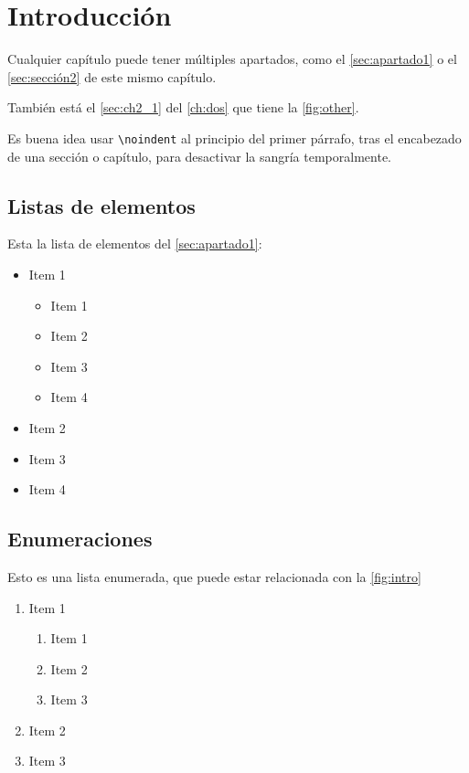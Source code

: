 \chapter{Introducción}
\label{ch:intro}

\noindent Cualquier capítulo puede tener múltiples apartados, como el \autoref{sec:apartado1} o el \autoref{sec:sección2} de este mismo capítulo.

También está el \autoref{sec:ch2_1} del \autoref{ch:dos} que tiene la \autoref{fig:other}.

Es buena idea usar \texttt{\textbackslash{noindent}} al principio del primer párrafo, tras el encabezado de una sección o capítulo, para desactivar la sangría temporalmente.

\section{Listas de elementos}
\label{sec:apartado1}

\noindent Esta la lista de elementos del \autoref{sec:apartado1}:

\begin{itemize}
    \item Item 1
    \begin{itemize}
        \item Item 1
        \item Item 2
        \item Item 3
        \item Item 4
    \end{itemize}
    
    \item Item 2
    \item Item 3
    \item Item 4
\end{itemize}

\section{Enumeraciones}
\label{sec:sección2}

\noindent Esto es una lista enumerada, que puede estar relacionada con la \autoref{fig:intro}

\begin{enumerate}
    \item Item 1
    \begin{enumerate}
        \item Item 1
        \item Item 2
        \item Item 3
    \end{enumerate}
    \item Item 2
    \item Item 3
\end{enumerate}

